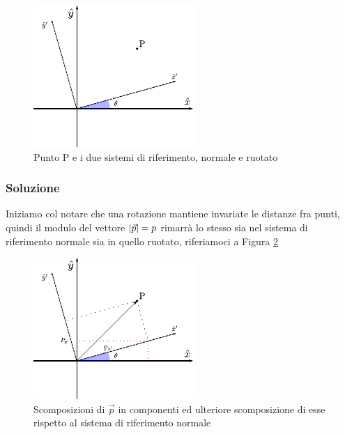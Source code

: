 \documentclass[12pt,a4paper]{book}
\begin{document}
\begin{figure}[h]
 \centering
\includegraphics[scale=1.8]{rotation.pdf}
 \caption{Punto P e i due sistemi di riferimento, normale e ruotato}
 \label{fig:rotation}
\end{figure}


\subsubsection*{Soluzione}
Iniziamo col notare che una rotazione mantiene invariate le distanze fra punti, quindi il modulo del vettore $\qty|\vec{p}|=p$ rimarrà lo stesso sia nel sistema di riferimento normale sia in quello ruotato, riferiamoci a Figura \ref{fig:rotation_sol}

\begin{figure}[h]
 \centering
\includegraphics[scale=1.8]{rotation_sol.pdf}
 \caption{Scomposizioni di $\vec{p}$ in componenti ed ulteriore scomposizione di esse rispetto al sistema di riferimento normale}
 \label{fig:rotation_sol}
\end{figure}
\end{document}
